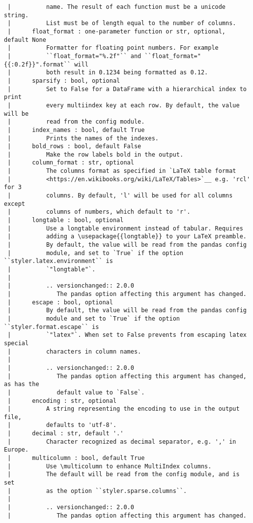 \documentclass[
  letterpaper,
  DIV=11,
  numbers=noendperiod]{scrreprt}
\begin{document}
\begin{verbatim}
 |          name. The result of each function must be a unicode string.
 |          List must be of length equal to the number of columns.
 |      float_format : one-parameter function or str, optional, default None
 |          Formatter for floating point numbers. For example
 |          ``float_format="%.2f"`` and ``float_format="{{:0.2f}}".format`` will
 |          both result in 0.1234 being formatted as 0.12.
 |      sparsify : bool, optional
 |          Set to False for a DataFrame with a hierarchical index to print
 |          every multiindex key at each row. By default, the value will be
 |          read from the config module.
 |      index_names : bool, default True
 |          Prints the names of the indexes.
 |      bold_rows : bool, default False
 |          Make the row labels bold in the output.
 |      column_format : str, optional
 |          The columns format as specified in `LaTeX table format
 |          <https://en.wikibooks.org/wiki/LaTeX/Tables>`__ e.g. 'rcl' for 3
 |          columns. By default, 'l' will be used for all columns except
 |          columns of numbers, which default to 'r'.
 |      longtable : bool, optional
 |          Use a longtable environment instead of tabular. Requires
 |          adding a \usepackage{{longtable}} to your LaTeX preamble.
 |          By default, the value will be read from the pandas config
 |          module, and set to `True` if the option ``styler.latex.environment`` is
 |          `"longtable"`.
 |      
 |          .. versionchanged:: 2.0.0
 |             The pandas option affecting this argument has changed.
 |      escape : bool, optional
 |          By default, the value will be read from the pandas config
 |          module and set to `True` if the option ``styler.format.escape`` is
 |          `"latex"`. When set to False prevents from escaping latex special
 |          characters in column names.
 |      
 |          .. versionchanged:: 2.0.0
 |             The pandas option affecting this argument has changed, as has the
 |             default value to `False`.
 |      encoding : str, optional
 |          A string representing the encoding to use in the output file,
 |          defaults to 'utf-8'.
 |      decimal : str, default '.'
 |          Character recognized as decimal separator, e.g. ',' in Europe.
 |      multicolumn : bool, default True
 |          Use \multicolumn to enhance MultiIndex columns.
 |          The default will be read from the config module, and is set
 |          as the option ``styler.sparse.columns``.
 |      
 |          .. versionchanged:: 2.0.0
 |             The pandas option affecting this argument has changed.

\end{verbatim}
\end{document}
